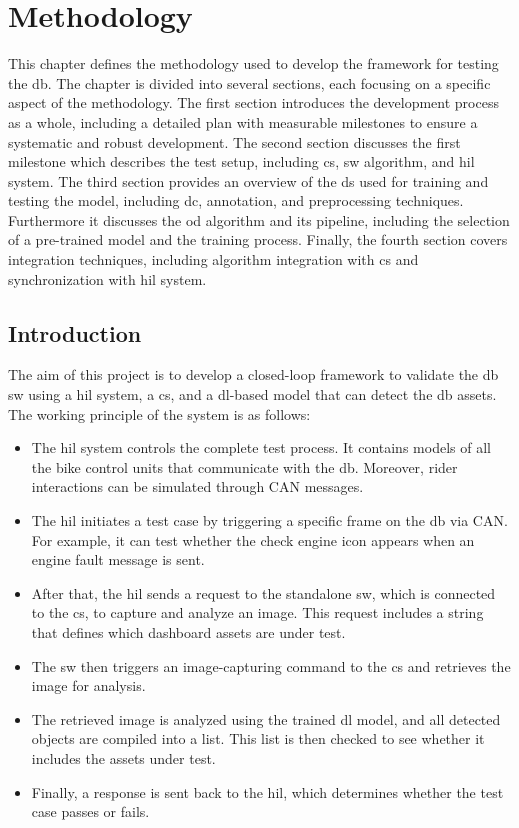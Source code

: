 

\chapter{Methodology} \label{ch:methodology}
This chapter defines the methodology used to develop the framework for testing the \gls{db}. The chapter is divided into several sections, each focusing on a specific aspect of the methodology. The first section introduces the development process as a whole, including a detailed plan with measurable milestones to ensure a systematic and robust development. The  second section discusses the first milestone which describes the test setup, including \gls{cs}, \gls{sw} algorithm, and \gls{hil} system. The third section provides an overview of the \gls{ds} used for training and testing the model, including \gls{dc}, annotation, and preprocessing techniques. Furthermore it discusses the \gls{od} algorithm and its pipeline, including the selection of a pre-trained model and the training process. Finally, the fourth section covers integration techniques, including algorithm integration with \gls{cs} and synchronization with \gls{hil} system.

\section{Introduction}

The aim of this project is to develop a closed-loop framework to validate the \gls{db} \gls{sw} using a \gls{hil} system, a \gls{cs}, and a \gls{dl}-based model that can detect the \gls{db} assets. The working principle of the system is as follows:

\begin{itemize}
    \item The \gls{hil} system controls the complete test process. It contains models of all the bike control units that communicate with the \gls{db}. Moreover, rider interactions can be simulated through CAN messages.
    \item The \gls{hil} initiates a test case by triggering a specific frame on the \gls{db} via CAN. For example, it can test whether the check engine icon appears when an engine fault message is sent.
    \item After that, the \gls{hil} sends a request to the standalone \gls{sw}, which is connected to the \gls{cs}, to capture and analyze an image. This request includes a string that defines which dashboard assets are under test.
    \item The \gls{sw} then triggers an image-capturing command to the \gls{cs} and retrieves the image for analysis.
    \item The retrieved image is analyzed using the trained \gls{dl} model, and all detected objects are compiled into a list. This list is then checked to see whether it includes the assets under test.
    \item Finally, a response is sent back to the \gls{hil}, which determines whether the test case passes or fails.
\end{itemize}

